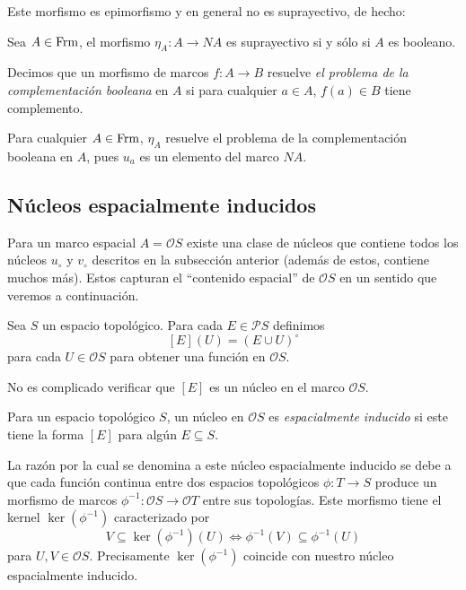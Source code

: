 Este morfismo es epimorfismo y en general no es suprayectivo, de hecho:

\begin{lem}
Sea $A\in \mathrm{Frm}$, el morfismo $\eta_A\colon A\to NA$ es suprayectivo si y sólo si $A$ es booleano.
\end{lem}

\begin{dfn}
Decimos que un morfismo de marcos $f\colon A\to B$ resuelve \emph{el problema de la complementación booleana} en $A$ si para cualquier $a\in A$, $f(a)\in B$ tiene complemento.
\end{dfn}

Para cualquier $A\in \mathrm{Frm}$, $\eta_A$ resuelve el problema de la complementación booleana en $A$, pues $u_a$ es un elemento del marco $NA$.

\subsection{Núcleos espacialmente inducidos}

Para un marco espacial $A=\mathcal{O}S$ existe una clase de núcleos que contiene todos los núcleos $u_\circ$ y $v_\circ$ descritos en la subsección anterior (además de estos, contiene muchos más). Estos capturan el ``contenido espacial'' de $\mathcal{O}S$ en un sentido que veremos a continuación.

\begin{dfn}\label{Definicion5.3.1}
    Sea $S$ un espacio topológico. Para cada $E\in \mathcal{P}S$ definimos 
    \[
    [E](U)=(E\cup U)^\circ
    \]
    para cada $U\in \mathcal{O}S$ para obtener una función en $\mathcal{O}S$.
\end{dfn}

No es complicado verificar que $[E]$ es un núcleo en el marco $\mathcal{O}S$.

\begin{dfn}\label{Definicon5.3.2}
    Para un espacio topológico $S$, un núcleo en $\mathcal{O}S$ es \emph{espacialmente inducido} si este tiene la forma $[E]$ para algún $E\subseteq S$.
\end{dfn}

La razón por la cual se denomina a este núcleo espacialmente inducido se debe a que cada función continua entre dos espacios topológicos $\phi\colon T\to S$ produce un morfismo de marcos $\phi^{-1}\colon \mathcal{O}S \to \mathcal{O}T$ entre sus topologías. Este morfismo tiene el kernel $\ker(\phi^{-1})$ caracterizado por 
\[
V\subseteq \ker(\phi^{-1})(U)\Leftrightarrow \phi^{-1}(V)\subseteq \phi^{-1}(U)
\]
para $U, V\in \mathcal{O}S$. Precisamente $\ker(\phi^{-1})$ coincide con nuestro núcleo espacialmente inducido.

